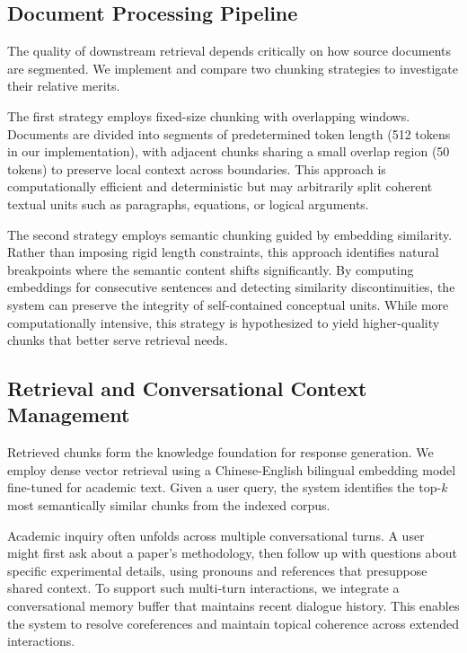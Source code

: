 \documentclass[11pt,a4paper]{article}
\begin{document}
\subsection{Document Processing Pipeline}

The quality of downstream retrieval depends critically on how source documents are segmented. We implement and compare two chunking strategies to investigate their relative merits.

The first strategy employs fixed-size chunking with overlapping windows. Documents are divided into segments of predetermined token length (512 tokens in our implementation), with adjacent chunks sharing a small overlap region (50 tokens) to preserve local context across boundaries. This approach is computationally efficient and deterministic but may arbitrarily split coherent textual units such as paragraphs, equations, or logical arguments.

The second strategy employs semantic chunking guided by embedding similarity. Rather than imposing rigid length constraints, this approach identifies natural breakpoints where the semantic content shifts significantly. By computing embeddings for consecutive sentences and detecting similarity discontinuities, the system can preserve the integrity of self-contained conceptual units. While more computationally intensive, this strategy is hypothesized to yield higher-quality chunks that better serve retrieval needs.

\subsection{Retrieval and Conversational Context Management}

Retrieved chunks form the knowledge foundation for response generation. We employ dense vector retrieval using a Chinese-English bilingual embedding model fine-tuned for academic text. Given a user query, the system identifies the top-$k$ most semantically similar chunks from the indexed corpus.

Academic inquiry often unfolds across multiple conversational turns. A user might first ask about a paper's methodology, then follow up with questions about specific experimental details, using pronouns and references that presuppose shared context. To support such multi-turn interactions, we integrate a conversational memory buffer that maintains recent dialogue history. This enables the system to resolve coreferences and maintain topical coherence across extended interactions.
\end{document}
